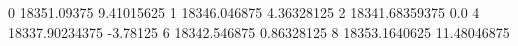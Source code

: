0 18351.09375 9.41015625
1 18346.046875 4.36328125
2 18341.68359375 0.0
4 18337.90234375 -3.78125
6 18342.546875 0.86328125
8 18353.1640625 11.48046875
